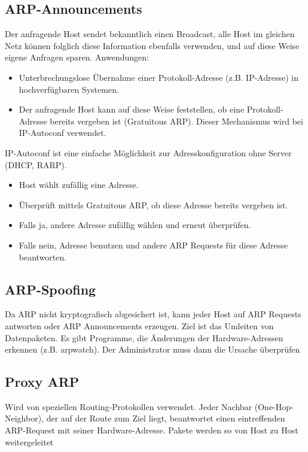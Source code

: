\documentclass{article} %
\begin{document}
\subsection{ARP-Announcements}

Der anfragende Host sendet bekanntlich einen Broadcast, alle Host im gleichen Netz können folglich diese Information ebenfalls verwenden, und auf diese Weise eigene Anfragen sparen.
Anwendungen:
\begin{itemize}
\item Unterbrechungslose Übernahme einer Protokoll-Adresse (z.B. IP-Adresse) in hochverfügbaren Systemen.
\item Der anfragende Host kann auf diese Weise feststellen, ob eine Protokoll-Adresse bereits vergeben ist (Gratuitous ARP). Dieser Mechanismus wird bei IP-Autoconf verwendet.
\end{itemize}

IP-Autoconf \cite{rfc3927} ist eine einfache Möglichkeit zur Adresskonfiguration ohne Server (DHCP, RARP).

\begin{itemize}
	\item Host wählt zufällig eine Adresse.
	\item Überprüft mittels Gratuitous ARP, ob diese Adresse bereits vergeben ist.
	\item Falls ja, andere Adresse zufällig wählen und erneut überprüfen.
	\item Falls nein, Adresse benutzen und andere ARP Requests für diese Adresse beantworten.
\end{itemize}

\subsection{ARP-Spoofing}

Da ARP nicht kryptografisch abgesichert ist, kann jeder Host auf ARP Requests antworten oder ARP Announcements erzeugen.
Ziel ist das Umleiten von Datenpaketen.
Es gibt Programme, die Änderungen der Hardware-Adressen erkennen (z.B. arpwatch).
Der Administrator muss dann die Ursache überprüfen

\subsection{Proxy ARP}

Wird von speziellen Routing-Protokollen verwendet.
Jeder Nachbar (One-Hop-Neighbor), der auf der Route zum Ziel liegt, beantwortet einen eintreffenden ARP-Request mit seiner Hardware-Adresse.
Pakete werden so von Host zu Host weitergeleitet
\end{document}
